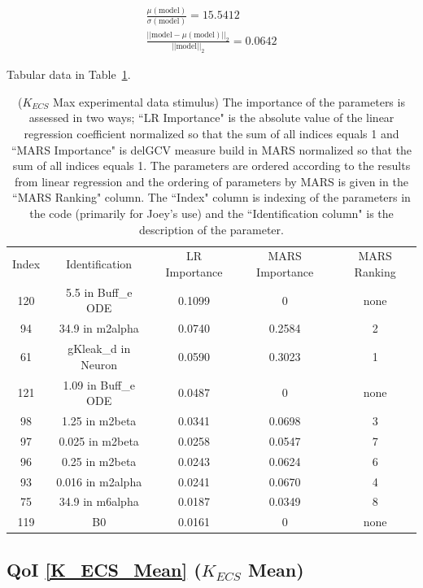 \documentclass[12pt]{article}
\numberwithin{equation}{section}
\begin{document}
\begin{eqnarray*}
\frac{\mu(\text{model})}{\sigma(\text{model})} = 15.5412\\
\frac{\vert \vert \text{model}-\mu(\text{model}) \vert \vert_2 }{\vert \vert \text{model}\vert \vert_2 } = 0.0642
\end{eqnarray*}

Tabular data in Table~\ref{qoi_K_ECS_Max_ex}.

\begin{table}[h]
\centering
\begin{tabular}{ccccc}
Index & Identification & LR Importance & MARS Importance & MARS Ranking \\
120 & 5.5 in Buff\_e ODE & 0.1099 & 0 & none\\
94 & 34.9 in m2alpha & 0.0740 & 0.2584 & 2\\
61 & gKleak\_d in Neuron & 0.0590 &  0.3023 & 1\\ 
121 & 1.09 in Buff\_e ODE & 0.0487 & 0 &  none\\
98 & 1.25 in m2beta & 0.0341 &  0.0698 & 3\\
97 & 0.025 in m2beta & 0.0258 & 0.0547 & 7\\
96 & 0.25 in m2beta & 0.0243 &  0.0624 & 6\\
93 & 0.016 in m2alpha & 0.0241 & 0.0670 & 4\\
75 & 34.9 in m6alpha & 0.0187 & 0.0349 & 8\\
119 & B0 & 0.0161 & 0 & none
\end{tabular}
\caption{ ($K_{ECS}$ Max experimental data stimulus) The importance of the parameters is assessed in two ways; ``LR Importance" is the absolute value of the linear regression coefficient normalized so that the sum of all indices equals 1 and ``MARS Importance" is delGCV measure build in MARS normalized so that the sum of all indices equals 1. The parameters are ordered according to the results from linear regression and the ordering of parameters by MARS is given in the ``MARS Ranking" column. The ``Index" column is indexing of the parameters in the code (primarily for Joey's use) and the ``Identification column" is the description of the parameter.}
\label{qoi_K_ECS_Max_ex}
\end{table}


\newpage
\subsection{QoI \eqref{K_ECS_Mean} ($K_{ECS}$ Mean)}
\end{document}
